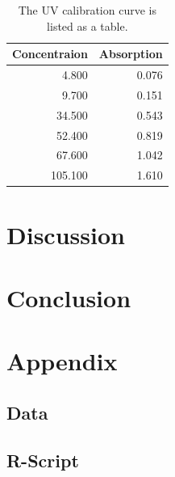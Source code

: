 \documentclass[12pt]{article}
\begin{document}
\begin{table}[H]
\centering
\caption{The UV calibration curve is listed as a table.} 
\begin{tabular}{r|r}
  \toprule
Concentraion & Absorption \\ 
  \midrule
4.800 & 0.076 \\ 
  9.700 & 0.151 \\ 
  34.500 & 0.543 \\ 
  52.400 & 0.819 \\ 
  67.600 & 1.042 \\ 
  105.100 & 1.610 \\ 
   \bottomrule
\end{tabular}
\end{table}

\section{Discussion}

\section{Conclusion}

\printbibliography

\section*{Appendix}

\subsection*{Data}

\subsection*{R-Script}
   
%
\end{document}
